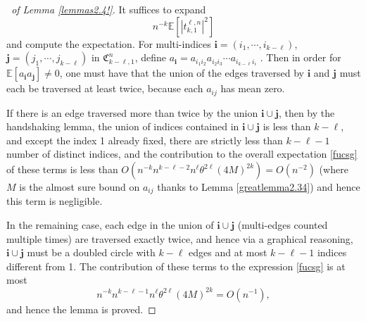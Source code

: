\documentclass[12pt, reqno]{amsart}
\theoremstyle{definition}
\theoremstyle{remark}
\numberwithin{equation}{section}
\begin{document}
\begin{proof}[\proofname\ of Lemma \ref{lemmas2.4!}] It suffices to expand
\begin{equation}\label{fucsg}n^{-k}\mathbb{E}[|t_{k,1}^{\ell,n}|^2]
\end{equation} and compute the expectation. For multi-indices $\mathbf{i}=(i_1,\cdots,i_{k-\ell})$, $\mathbf{j}=(j_1,\cdots,j_{k-\ell})$ in $\mathfrak{C}_{k-\ell,1}^n$, define $a_\mathbf{i}=a_{i_1i_2}a_{i_2i_3}\cdots a_{i_{k-\ell}i_i}$ . Then in order for $\mathbb{E}[a_\mathbf{i}a_\mathbf{j}]\neq 0$, one must have that the union of the edges traversed by $\mathbf{i}$ and $\mathbf{j}$ must each be traversed at least twice, because each $a_{ij}$ has mean zero. 

If there is an edge traversed more than twice by the union $\mathbf{i}\cup\mathbf{j}$, then by the handshaking lemma, the union of indices contained in $\mathbf{i}\cup \mathbf{j}$ is less than $k-\ell$, and except the index 1 already fixed, there are strictly less than $k-\ell-1$ number of distinct indices, and the contribution to the overall expectation \eqref{fucsg} of these terms is less than $O(n^{-k}n^{k-\ell-2}n^\ell \theta^{2\ell}(4M)^{2k})=O(n^{-2})$ (where $M$ is the almost sure bound on $a_{ij}$ thanks to Lemma \ref{greatlemma2.34}) and hence this term is negligible.

In the remaining case, each edge in the union of $\mathbf{i}\cup\mathbf{j}$ (multi-edges counted multiple times) are traversed exactly twice, and hence via a graphical reasoning, $\mathbf{i}\cup \mathbf{j}$ must be a doubled circle with $k-\ell$ edges and at most $k-\ell-1$ indices different from 1. The contribution of these terms to the expression \eqref{fucsg} is at most 
$$
n^{-k} n^{k-\ell-1}n^{\ell}\theta^{2\ell}(4M)^{2k}=O(n^{-1}),
$$ and hence the lemma is proved.
\end{proof}
\end{document}

